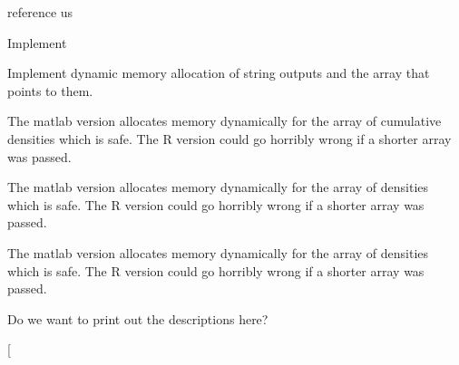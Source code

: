 \begin{DoxyRefList}
\item[\label{todo__todo000008}%
\hypertarget{todo__todo000008}{}%
Global \hyperlink{_hyper_sphere_geodesic_8h_a16d98ff2d1ad0e4d662b8631c72f9931}{Hyper\-Sphere\-Geodesic\-Distance\-P\-D\-F} (double t, double $\ast$parameters)]reference us  
\item[\label{todo__todo000009}%
\hypertarget{todo__todo000009}{}%
Global \hyperlink{_hyper_sphere_geodesic_8h_a203990a77a11670e5ab591d64461fca4}{Hyper\-Sphere\-Geodesic\-Distance\-Var} (double $\ast$parameters)]Implement  
\item[\label{todo__todo000015}%
\hypertarget{todo__todo000015}{}%
Global \hyperlink{group__api_gadb58de53bac5d2fe684019ce77be9896}{Line\-Picking\-All\-Problems} (char $\ast$$\ast$names, char $\ast$$\ast$, int $\ast$, double $\ast$$\ast$)]Implement dynamic memory allocation of string outputs and the array that points to them.  
\item[\label{todo__todo000018}%
\hypertarget{todo__todo000018}{}%
Global \hyperlink{group__api_ga445ba2c007d60d789747cecbd5f874b9}{Line\-Picking\-C\-D\-F} (double $\ast$, double $\ast$, int $\ast$, int $\ast$, double $\ast$, int $\ast$, int $\ast$, char $\ast$$\ast$)]The matlab version allocates memory dynamically for the array of cumulative densities which is safe. The R version could go horribly wrong if a shorter array was passed.  
\item[\label{todo__todo000019}%
\hypertarget{todo__todo000019}{}%
Global \hyperlink{group__api_ga89bd29435ffe1826e97dafb2b0536de1}{Line\-Picking\-Ncoords} (int $\ast$, char $\ast$$\ast$, int $\ast$, double $\ast$, int $\ast$, int $\ast$, char $\ast$$\ast$)]The matlab version allocates memory dynamically for the array of densities which is safe. The R version could go horribly wrong if a shorter array was passed.  
\item[\label{todo__todo000017}%
\hypertarget{todo__todo000017}{}%
Global \hyperlink{group__api_ga8feba9835984bd74f3d919f51389e573}{Line\-Picking\-P\-D\-F} (double $\ast$, double $\ast$, int $\ast$, int $\ast$, double $\ast$, int $\ast$, int $\ast$, char $\ast$$\ast$)]The matlab version allocates memory dynamically for the array of densities which is safe. The R version could go horribly wrong if a shorter array was passed.  
\item[\label{todo__todo000014}%
\hypertarget{todo__todo000014}{}%
Global \hyperlink{group__api_ga1a1c27d3c46da382a0443f810628a8ac}{Line\-Picking\-Print\-All\-Problems} (void)]Do we want to print out the descriptions here?  
\item[\label{todo__todo000013}%
$$
\end{DoxyRefList}
